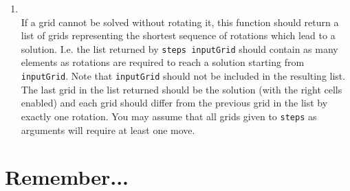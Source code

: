 \begin{enumerate}
	\item {}\\
	If a grid cannot be solved without rotating it, this function should return a list of grids representing the shortest sequence of rotations which lead to a solution. I.e. the list returned by \texttt{\small steps inputGrid} should contain as many elements as rotations are required to reach a solution starting from \texttt{\small inputGrid}. Note that \texttt{\small inputGrid} should not be included in the resulting list. The last grid in the list returned should be the solution (with the right cells enabled) and each grid should differ from the previous grid in the list by exactly one rotation. You may assume that all grids given to \texttt{\small steps} as arguments will require at least one move.
\end{enumerate}


\section{Remember...}

